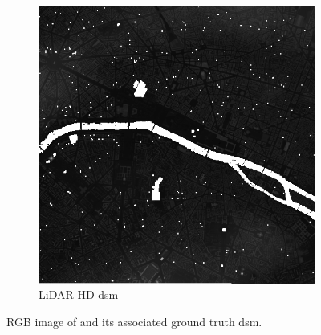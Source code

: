 \begin{figure}
\begin{subfigure}[t]{0.48\linewidth}
        \includegraphics[width=\linewidth]{Images/Chap_6/miniature_Paris_gt.png}
        \caption{LiDAR HD \acrshort{dsm}}
        \label{fig:miniature_Paris_gt}
    \end{subfigure}
    \caption{RGB image of  and its associated ground truth \acrshort{dsm}.}
    \label{fig:miniature_Paris}
\end{figure}

